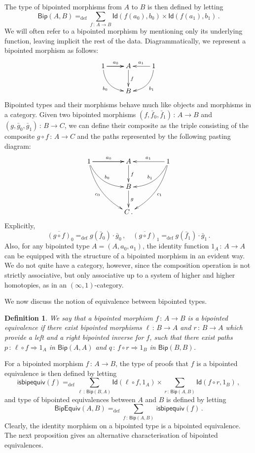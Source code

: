 \documentclass[10pt,a4paper,oneside,reqno]{amsart}
\theoremstyle{mythm}
\theoremstyle{mydef}
\newtheorem{definition}[theorem]{Definition}
\theoremstyle{myrmk}
\newcommand{\ie}{\text{i.e.\ }}
\newcommand{\myemph}[1]{\textit{#1}}
\newcommand{\defeq}{=_{\mathrm{def}}}
\newcommand{\co}{\,{:}\,}
\newcommand{\Id}{\mathsf{Id}}
\newcommand{\Bip}{\mathsf{Bip}}
\newcommand{\BipHom}{\mathsf{Bip}}
\newcommand{\isbipequiv}{\mathsf{isbipequiv}}
\newcommand{\BipEquiv}{\mathsf{BipEquiv}}
\begin{document}
The type of bipointed morphisms from $A$ to $B$ is then defined by letting
\[
\BipHom(A,B) \defeq \sum_{ f \co A \to B} \Id(  f(a_0), b_0 )  \times \Id(  f(a_1), b_1 ) \, .
\]
We will often refer to a bipointed morphism by mentioning only its underlying function, leaving implicit
the rest of the data. Diagrammatically, we represent a bipointed morphism as follows:
\[
\xymatrix{
1 \ar[r]   \ar[r]^{a_0} \ar@/_1pc/[dr]_{b_0}  & A  \ar[d]^{f} & 1  \ar[l]_{a_1} \ar@/^1pc/[dl]^{b_1} \\
  & B  &  }
 \]
Bipointed types and their morphisms behave much like objects and morphisms in a category.
Given two bipointed morphisms  $(f, \bar{f}_0, \bar{f}_1) \co A \to B$ and $(g, \bar{g}_0, \bar{g}_1) \co B \to C$, we can define their composite 
 as the triple consisting of the composite $g \circ f \co A \to C$ and the paths represented
by the following pasting diagram:
\[
\xymatrix@C=1.5cm{
1 \ar[r]   \ar[r]^{a_0}   \ar@/_1pc/[dr]^{b_0} \ar@/_1pc/[ddr]_{c_0}  & A  \ar[d]^{f} & 1 \ar[l]_{a_1}  \ar@/^1pc/[dl]_{b_1}  \ar@/^1pc/[ddl]^{c_1} \\
  & B \ar[d]^g &   \\
  & C \, . &   }
  \]
Explicitly,
\[
\overline{(g \circ f)}_0 \defeq g(\bar{f}_0) \cdot  \bar{g}_0 \, ,   \quad 
\overline{(g \circ f) }_1 \defeq  g(\bar{f}_1) \cdot   \bar{g}_1 \, .
\]
Also, for any bipointed type $A = (A, a_0, a_1)$, the identity function $1_A \co A \to A$ can be equipped with the structure of a 
bipointed morphism in an evident way. 
We do not quite have a category, however, since the composition operation is not strictly associative, but only associative up to a system of higher and higher 
homotopies, as in an $(\infty,1)$-category.  

\medskip

We now discuss the notion of equivalence between bipointed types.



\begin{definition} We say that a bipointed morphism $f \co A \to B$ is a \myemph{bipointed equivalence}
if there exist bipointed morphisms $\ell \co B \to A$ and $r \co B \to A$ which provide a left and a right bipointed inverse for $f$, \ie such that there exist paths $p \co \ell \circ f \Rightarrow 1_A$ in $\Bip(A,A)$ and $q \co f \circ r \Rightarrow 1_B$
in $\Bip(B,B)$.
\end{definition}

For a bipointed morphism $f \co A \to B$, the type of proofs that $f$ is a bipointed equivalence is
then defined by letting
\[
\isbipequiv(f) \defeq   \sum_{\ell \co \BipHom(B,A)} \Id( \ell \circ f, 1_A ) \times 
    \sum_{r \co \BipHom(A, B)} \Id (f \circ r , 1_B ) \, ,
\]
and type of bipointed equivalences between $A$ and $B$ is defined by letting
\[
\BipEquiv(A, B)
\defeq    
\sum_{f \co \BipHom(A,B)} \, \isbipequiv(f)  \, . 
\] 
Clearly, the identity morphism on a bipointed type is a bipointed equivalence. The next proposition
gives an alternative characterisation of bipointed equivalences.
\end{document}
